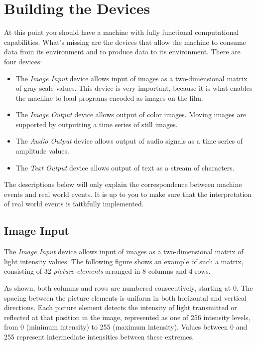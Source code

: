 \documentclass[a4paper,12pt]{article}
\begin{document}
\section{Building the Devices}
\label{sec:building-devices}

At this point you should have a machine with fully functional computational capabilities.
What's missing are the devices that allow the machine to consume data from its environment and to produce data to its environment.
There are four devices:
\begin{itemize}
\item The \emph{Image Input} device allows input of images as a two-dimensional matrix of gray-scale values.
  This device is very important, because it is what enables the machine to load programs encoded as images on the film.
\item The \emph{Image Output} device allows output of color images.
  Moving images are supported by outputting a time series of still images.
\item The \emph{Audio Output} device allows output of audio signals as a time series of amplitude values.
\item The \emph{Text Output} device allows output of text as a stream of characters.
\end{itemize}
The descriptions below will only explain the correspondence between machine events and real world events.
It is up to you to make sure that the interpretation of real world events is faithfully implemented.

\subsection{Image Input}

The \emph{Image Input} device allows input of images as a two-dimensional matrix of light intensity values.
The following figure shows an example of such a matrix, consisting of 32 \emph{picture elements} arranged in 8 columns and 4 rows.
\begin{center}
\end{center}
As shown, both columns and rows are numbered consecutively, starting at 0.
The spacing between the picture elements is uniform in both horizontal and vertical directions.
Each picture element detects the intensity of light transmitted or reflected at that position in the image, represented as one of 256 intensity levels, from 0 (minimum intensity) to 255 (maximum intensity).
Values between 0 and 255 represent intermediate intensities between these extremes.
\end{document}

